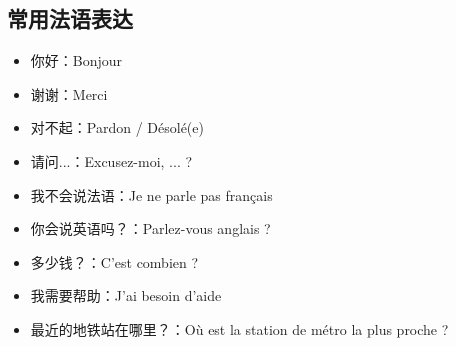 \subsection{常用法语表达}
\begin{itemize}
    \item 你好：Bonjour
    \item 谢谢：Merci
    \item 对不起：Pardon / Désolé(e)
    \item 请问...：Excusez-moi, ... ?
    \item 我不会说法语：Je ne parle pas français
    \item 你会说英语吗？：Parlez-vous anglais ?
    \item 多少钱？：C'est combien ?
    \item 我需要帮助：J'ai besoin d'aide
    \item 最近的地铁站在哪里？：Où est la station de métro la plus proche ?
\end{itemize}
